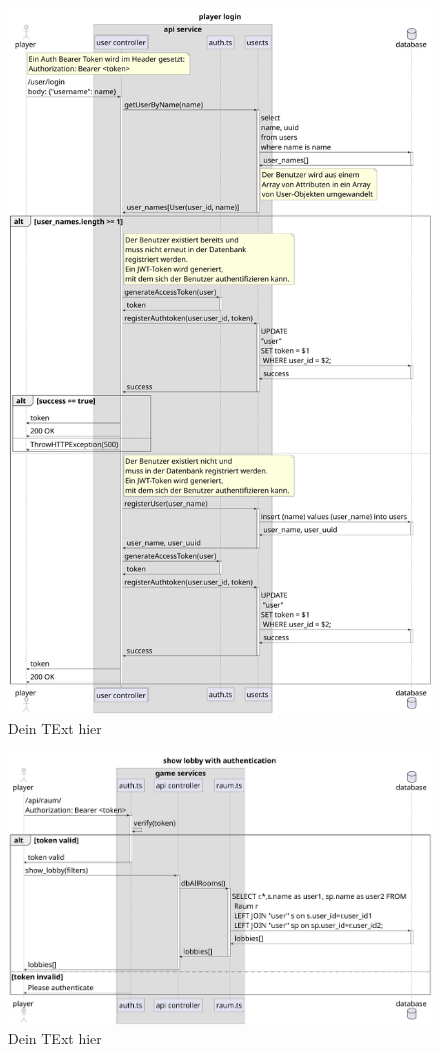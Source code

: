 \documentclass[
]{article}
\begin{document}
\begin{figure}[H]
	\centering
	\includegraphics[width=\textwidth ]{resources/login.pdf}
	\caption{Dein TExt hier}
	\label{fig:ablaufdiagramm-login}
\end{figure}
\begin{figure}[H]
	\centering
	\includegraphics[width=\textwidth ]{resources/show_lobby.pdf}
	\caption{Dein TExt hier}
	\label{fig:ablaufdiagramm-show_lobby}
\end{figure}
\end{document}
